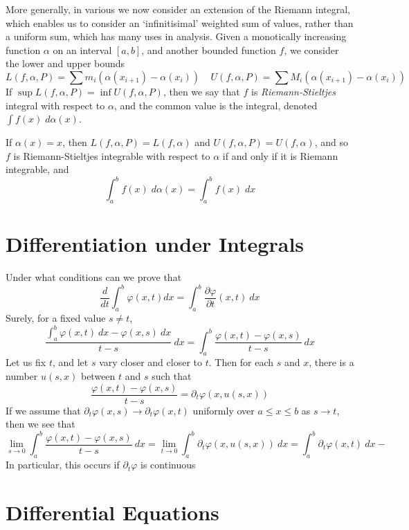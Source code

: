 More generally, in various we now consider an extension of the Riemann integral, which enables us to consider an `infinitisimal' weighted sum of values, rather than a uniform sum, which has many uses in analysis. Given a monotically increasing function $\alpha$ on an interval $[a,b]$, and another bounded function $f$, we consider the lower and upper bounds
%
\[ L(f,\alpha,P) = \sum m_i (\alpha(x_{i+1}) - \alpha(x_i))\ \ \ \ \ U(f,\alpha,P) = \sum M_i(\alpha(x_{i+1}) - \alpha(x_i)) \]
%
If $\sup L(f,\alpha,P) = \inf U(f,\alpha,P)$, then we say that $f$ is {\it Riemann-Stieltjes} integral with respect to $\alpha$, and the common value is the integral, denoted $\int f(x)\; d\alpha(x)$.

\begin{example}
    If $\alpha(x) = x$, then $L(f,\alpha,P) = L(f,\alpha)$ and $U(f,\alpha,P) = U(f,\alpha)$, and so $f$ is Riemann-Stieltjes integrable with respect to $\alpha$ if and only if it is Riemann integrable, and
    \[ \int_a^b f(x)\; d\alpha(x) = \int_a^b f(x)\; dx \]
\end{example}

\chapter{Differentiation under Integrals}

Under what conditions can we prove that
%
\[ \frac{d}{dt} \int_a^b \varphi(x,t) dx = \int_a^b \frac{\partial \varphi}{\partial t}(x,t)\ dx \]
%
Surely, for a fixed value $s \neq t$,
%
\[ \frac{\int_a^b \varphi(x,t)\ dx - \varphi(x,s)\ dx}{t - s}\ dx = \int_a^b \frac{\varphi(x,t) - \varphi(x,s)}{t - s}\ dx \]
%
Let us fix $t$, and let $s$ vary closer and closer to $t$. Then for each $s$ and $x$, there is a number $u(s,x)$ between $t$ and $s$ such that
%
\[ \frac{\varphi(x,t) - \varphi(x,s)}{t - s} = \partial_t \varphi(x,u(s,x)) \]
%
If we assume that $\partial_t \varphi(x,s) \to \partial_t \varphi(x,t)$ uniformly over $a \leq x \leq b$ as $s \to t$, then we see that
%
\[ \lim_{s \to 0} \int_a^b \frac{\varphi(x,t) - \varphi(x,s)}{t - s}\ dx = \lim_{t \to 0} \int_a^b \partial_t \varphi(x,u(s,x))\ dx = \int_a^b \partial_t \varphi(x,t)\ dx- \]
%
In particular, this occurs if $\partial_t \varphi$ is continuous

\chapter{Differential Equations}

